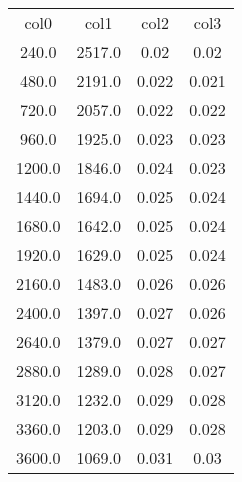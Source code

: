 \begin{table}
\begin{tabular}{cccc}
col0 & col1 & col2 & col3 \\
240.0 & 2517.0 & 0.02 & 0.02 \\
480.0 & 2191.0 & 0.022 & 0.021 \\
720.0 & 2057.0 & 0.022 & 0.022 \\
960.0 & 1925.0 & 0.023 & 0.023 \\
1200.0 & 1846.0 & 0.024 & 0.023 \\
1440.0 & 1694.0 & 0.025 & 0.024 \\
1680.0 & 1642.0 & 0.025 & 0.024 \\
1920.0 & 1629.0 & 0.025 & 0.024 \\
2160.0 & 1483.0 & 0.026 & 0.026 \\
2400.0 & 1397.0 & 0.027 & 0.026 \\
2640.0 & 1379.0 & 0.027 & 0.027 \\
2880.0 & 1289.0 & 0.028 & 0.027 \\
3120.0 & 1232.0 & 0.029 & 0.028 \\
3360.0 & 1203.0 & 0.029 & 0.028 \\
3600.0 & 1069.0 & 0.031 & 0.03 \\
\end{tabular}
\end{table}
